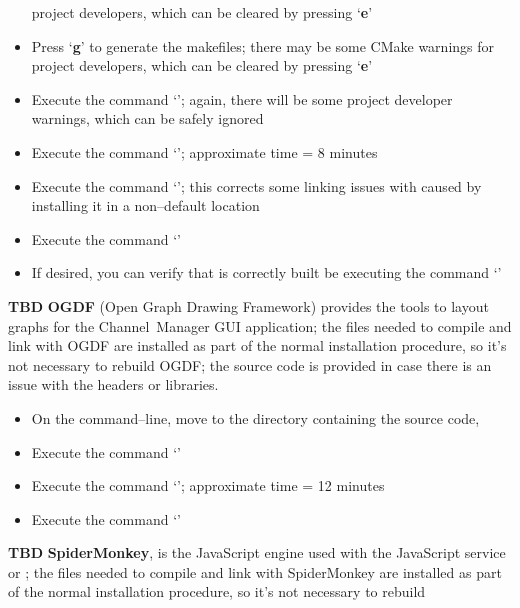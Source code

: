 \begin{itemize}
project developers, which can be cleared by pressing `\textbf{e}'
\item Press `\textbf{g}' to generate the makefiles; there may be some CMake warnings for
project developers, which can be cleared by pressing `\textbf{e}'
\item Execute the command `'; again, there will be some project developer
warnings, which can be safely ignored
\item Execute the command `'; approximate time = 8 minutes
\item Execute the command `'; this corrects some linking
issues with \yarp{} caused by installing it in a non--default location
\item Execute the command `'
\item If desired, you can verify that \yarp{} is correctly built be executing the command
`'
\end{itemize}
\tertiaryEnd{}
\textbf{TBD}
\tertiaryEnd{}
\secondaryEnd{}
\textbf{OGDF} (Open Graph Drawing Framework) provides the tools to layout graphs for the
Channel~Manager GUI application; the files needed to compile and link with OGDF are
installed as part of the normal \mplusm{} installation procedure, so it's not necessary to
rebuild OGDF; the source code is provided in case there is an issue with the headers or
libraries.
\begin{itemize}
\item On the command--line, move to the directory containing the \mplusm{} source code,
\item Execute the command `'
\item Execute the command `'; approximate time
= 12 minutes
\item Execute the command `'
\end{itemize}
\tertiaryEnd{}
\textbf{TBD}
\tertiaryEnd{}
\secondaryEnd{}
\textbf{SpiderMonkey}, is the JavaScript engine used with the JavaScript service or
\mplusm{}; the files needed to compile and link with SpiderMonkey are installed as part of
the normal \mplusm{} installation procedure, so it's not necessary to rebuild
